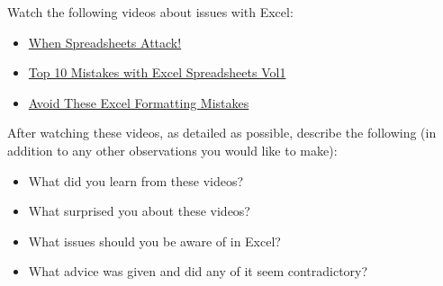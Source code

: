 \documentclass[11pt,letterpaper]{article}
\begin{document}
\newpage



 Watch the following videos about issues with Excel:
	\begin{itemize}
	\item \href{https://www.youtube.com/watch?v=yb2zkxHDfUE&ab_channel=Stand-upMaths}{When Spreadsheets Attack!}
	\item \href{https://www.youtube.com/watch?v=3tkz5MNg4FA&ab_channel=QIMacros}{Top 10 Mistakes with Excel Spreadsheets Vol1}
	\item \href{https://www.youtube.com/watch?v=ujExCcncT6k&ab_channel=Pete-HowToAnalyst}{Avoid These Excel Formatting Mistakes}
	\end{itemize}
After watching these videos, as detailed as possible, describe the following (in addition to any other observations you would like to make):
	\begin{itemize}
	\item What did you learn from these videos?
	\item What surprised you about these videos?
	\item What issues should you be aware of in Excel?
	\item What advice was given and did any of it seem contradictory?
	\end{itemize}
\end{document}
